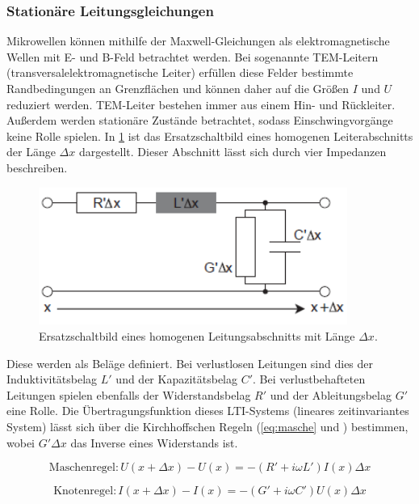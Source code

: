\subsubsection{Stationäre Leitungsgleichungen}
Mikrowellen können mithilfe der Maxwell-Gleichungen als elektromagnetische Wellen mit E- und B-Feld betrachtet werden. Bei sogenannte TEM-Leitern (transversalelektromagnetische Leiter) erfüllen diese Felder bestimmte Randbedingungen an Grenzflächen und können daher auf die Größen $I$ und $U$ reduziert werden. TEM-Leiter bestehen immer aus einem Hin- und Rückleiter. Außerdem werden stationäre Zustände betrachtet, sodass Einschwingvorgänge keine Rolle spielen. In \cref{ersatz} ist das Ersatzschaltbild eines homogenen Leiterabschnitts der Länge $\Delta x$ dargestellt. Dieser Abschnitt lässt sich durch vier Impedanzen beschreiben.

\begin{figure}[h]
	\centering
	\includegraphics[width=0.9\textwidth]{Ersatzschaltbild.png}
	\caption{Ersatzschaltbild eines homogenen Leitungsabschnitts mit Länge $\Delta x$.}
	\label{ersatz}
\end{figure}

Diese werden als Beläge definiert. Bei verlustlosen Leitungen sind dies der Induktivitätsbelag $L'$ und der Kapazitätsbelag $C'$. Bei verlustbehafteten Leitungen spielen ebenfalls der Widerstandsbelag $R'$ und der Ableitungsbelag $G'$ eine Rolle. Die Übertragungsfunktion dieses LTI-Systems (lineares zeitinvariantes System) lässt sich über die Kirchhoffschen Regeln (\cref{eq:masche} und ) bestimmen, wobei $G' \Delta x$ das Inverse eines Widerstands ist.

\begin{equation}
	\text{Maschenregel}: U(x + \Delta x) - U(x) = -(R' + i\omega L')I(x) \Delta x
	\label{eq:masche}
\end{equation}

\begin{equation}
	\text{Knotenregel}: I(x + \Delta x) - I(x) = -(G' + i\omega C')U(x) \Delta x
	\label{eq:knoten}
\end{equation}

